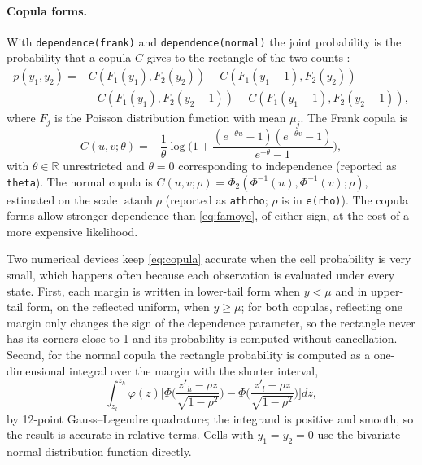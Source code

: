\documentclass[11pt,a4paper]{article}
\newcommand{\cmd}[1]{\texttt{#1}}
\begin{document}
\paragraph{Copula forms.} With \cmd{dependence(frank)} and \cmd{dependence(normal)} the joint
probability is the probability that a copula $C$ gives to the rectangle of the two counts
\citep{cameron2004}:
\begin{equation}\label{eq:copula}
\begin{split}
p(y_1,y_2)={}&C(F_1(y_1),F_2(y_2))-C(F_1(y_1-1),F_2(y_2))\\
&-C(F_1(y_1),F_2(y_2-1))+C(F_1(y_1-1),F_2(y_2-1)),
\end{split}
\end{equation}
where $F_j$ is the Poisson distribution function with mean $\mu_j$. The Frank copula
\citep{frank1979,nelsen2006} is
\begin{equation}
C(u,v;\theta)=-\frac1\theta\log\Big(1+\frac{(e^{-\theta u}-1)(e^{-\theta v}-1)}{e^{-\theta}-1}\Big),
\end{equation}
with $\theta\in\mathbb R$ unrestricted and $\theta=0$ corresponding to independence (reported as
\cmd{theta}). The normal copula is $C(u,v;\rho)=\Phi_2(\Phi^{-1}(u),\Phi^{-1}(v);\rho)$, estimated
on the scale $\operatorname{atanh}\rho$ (reported as \cmd{athrho}; $\rho$ is in \cmd{e(rho)}). The
copula forms allow stronger dependence than \eqref{eq:famoye}, of either sign, at the cost of a more
expensive likelihood.

Two numerical devices keep \eqref{eq:copula} accurate when the cell probability is very small, which
happens often because each observation is evaluated under every state. First, each margin is written
in lower-tail form when $y<\mu$ and in upper-tail form, on the reflected uniform, when $y\ge\mu$; for
both copulas, reflecting one margin only changes the sign of the dependence parameter, so the
rectangle never has its corners close to 1 and its probability is computed without cancellation.
Second, for the normal copula the rectangle probability is computed as a one-dimensional integral
over the margin with the shorter interval,
\begin{equation}
\int_{z_l}^{z_h}\varphi(z)\Big[\Phi\Big(\frac{z'_h-\rho z}{\sqrt{1-\rho^2}}\Big)-\Phi\Big(\frac{z'_l-\rho z}{\sqrt{1-\rho^2}}\Big)\Big]dz,
\end{equation}
by 12-point Gauss--Legendre quadrature; the integrand is positive and smooth, so the result is
accurate in relative terms. Cells with $y_1=y_2=0$ use the bivariate normal distribution function
directly.
\end{document}

